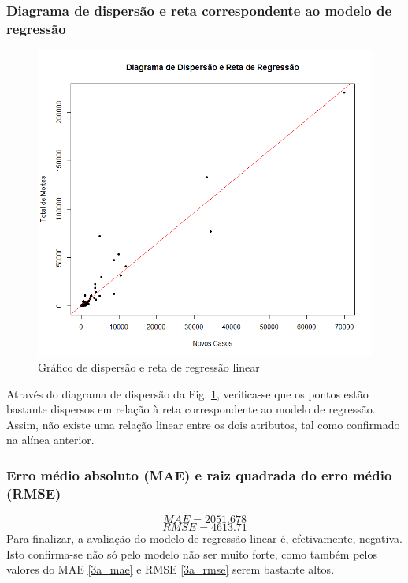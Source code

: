 \documentclass[conference]{IEEEtran}
\begin{document}
\subsubsection{Diagrama de dispersão e reta correspondente ao modelo de regressão}
\begin{figure}[htbp]
\centerline{\includegraphics[width=0.95\columnwidth]{images/03.png}}
\caption{Gráfico de dispersão e reta de regressão linear}
\label{3a}
\end{figure}
Através do diagrama de dispersão da Fig. \ref{3a}, verifica-se que os pontos estão bastante dispersos em relação à reta correspondente ao modelo de regressão. Assim, não existe uma relação linear entre os dois atributos, tal como confirmado na alínea anterior.

\subsubsection{Erro médio absoluto (MAE) e raiz quadrada do erro médio (RMSE)}
\begin{equation}
MAE = 2051.678\label{3a_mae}
\end{equation}
\begin{equation}
RMSE = 4613.71\label{3a_rmse}
\end{equation}
Para finalizar, a avaliação do modelo de regressão linear é, efetivamente, negativa. Isto confirma-se não só pelo modelo não ser muito forte, como também pelos valores do MAE \eqref{3a_mae} e RMSE \eqref{3a_rmse} serem bastante altos.
\end{document}
